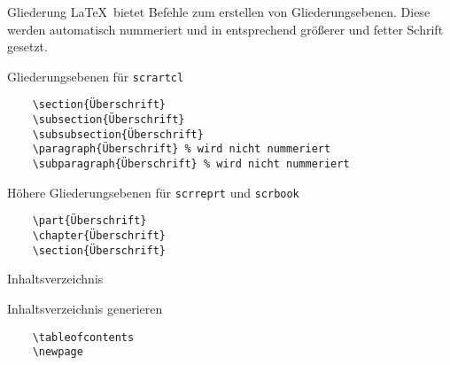 \begin{frame}[fragile]{Gliederung}
  \LaTeX\ bietet Befehle zum erstellen von Gliederungsebenen.
  Diese werden automatisch nummeriert und in entsprechend größerer und fetter Schrift gesetzt.

  \begin{block}{Gliederungsebenen für \texttt{scrartcl}}
    \begin{lstlisting}
    \section{Überschrift}
    \subsection{Überschrift}
    \subsubsection{Überschrift}
    \paragraph{Überschrift} % wird nicht nummeriert
    \subparagraph{Überschrift} % wird nicht nummeriert
    \end{lstlisting}
  \end{block}
  \begin{block}{Höhere Gliederungsebenen für \texttt{scrreprt} und \texttt{scrbook}}
    \begin{lstlisting}
    \part{Überschrift}
    \chapter{Überschrift}
    \section{Überschrift}
    \end{lstlisting}
  \end{block}
\end{frame}

\begin{frame}[fragile]{Inhaltsverzeichnis}
  \begin{block}{Inhaltsverzeichnis generieren}
    \begin{lstlisting}
    \tableofcontents
    \newpage
    \end{lstlisting}
  \end{block}
\end{frame}

